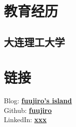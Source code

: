 \documentclass[]{deedy-resume-openfont}
\begin{document}
%
%
\lastupdated

%
%

%
%

\begin{minipage}[t]{0.25\textwidth} 


\section{教育经历} 
\sectionsep

\subsection{大连理工大学}
\sectionsep


\section{链接}
\sectionsep
Blog:  \href{https://blog.fuujiro.com}{\bf fuujiro's island} \\
Github: \href{https://github.com/fuujiro}{\bf fuujiro} \\
LinkedIn:  \href{https://www.linkedin.com/in/fuujiro}{\bf xxx} \\




\end{minipage}
\end{document}
